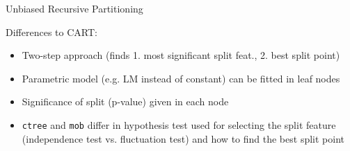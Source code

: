 \documentclass[10pt,compress,t,notes=noshow, xcolor=table]{beamer}
\begin{document}
\begin{frame}{Unbiased Recursive Partitioning}

Differences to CART:
\begin{itemize}
    \item Two-step approach (finds 1. most significant split feat., 2. best split point)
    \item Parametric model (e.g. LM instead of constant) can be fitted in leaf nodes %
    \item Significance of split (p-value) given in each node
    \item \texttt{ctree} and \texttt{mob} differ in hypothesis test used for selecting the split feature (independence test vs. fluctuation test) and how to find the best split point
\end{itemize}

\medskip


\end{frame}
\end{document}
